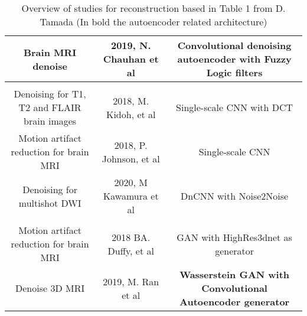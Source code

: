\begin{table}[!ht]
\begin{tabularx}{\textwidth}{C C C}
        Brain MRI denoise & 2019, N. Chauhan et al \cite{fuzzyautoencoder} & \textbf{Convolutional denoising autoencoder with Fuzzy Logic filters} \\

        \hline
        \\
        \hline

        Denoising for T1, T2 and FLAIR brain images & 2018, M. Kidoh, et al \cite{kidoh2019scnnt1} & Single-scale CNN with DCT \\
        
        Motion artifact reduction for brain MRI & 2018, P. Johnson, et al \cite{scnnmotion} & Single-scale CNN\\
        
        Denoising for multishot DWI & 2020, M Kawamura et al \cite{dncnnnoise2noise} & DnCNN with Noise2Noise \\
        
        \hline
        \\
        \hline
        
        Motion artifact reduction for brain MRI & 2018 BA. Duffy, et al \cite{ganHR3d} & GAN with HighRes3dnet as generator \\
        
        Denoise 3D MRI & 2019, M. Ran et al \cite{wganautoencoder} & \textbf{Wasserstein GAN with Convolutional Autoencoder generator} \\
 
    \hline
    \end{tabularx}
    \caption{Overview of studies for reconstruction based in Table 1 from D. Tamada \cite{tamada2020review} (In bold the autoencoder related architecture)}
    \label{table:paper_overview}
\end{table}

\FloatBarrier

